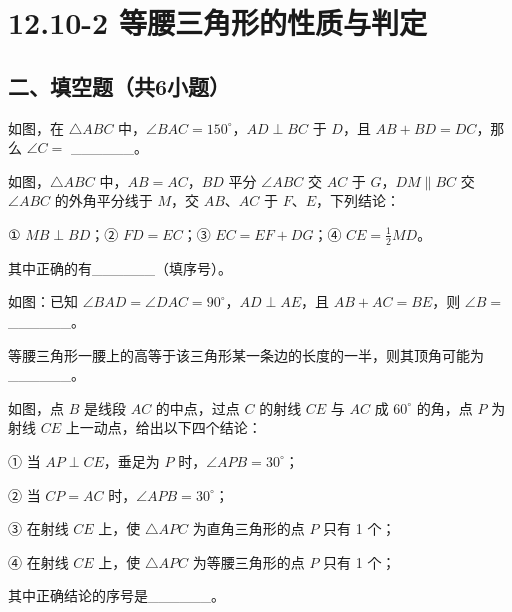 \chapter{12.10-2 等腰三角形的性质与判定}


\section*{二、填空题（共6小题）}

\blanklist[9]

\item 如图，在 $\triangle ABC$ 中，$\angle BAC = 150^\circ$，$AD \perp BC$ 于 $D$，且 $AB + BD = DC$，那么 $\angle C =$ \_\_\_\_\_\_。


\item 如图，$\triangle ABC$ 中，$AB = AC$，$BD$ 平分 $\angle ABC$ 交 $AC$ 于 $G$，$DM \parallel BC$ 交 $\angle ABC$ 的外角平分线于 $M$，交 $AB$、$AC$ 于 $F$、$E$，下列结论：

① $MB \perp BD$；② $FD = EC$；③ $EC = EF + DG$；④ $CE = \frac{1}{2}MD$。

其中正确的有\_\_\_\_\_\_（填序号）。


\item 如图：已知 $\angle BAD = \angle DAC = 90^\circ$，$AD \perp AE$，且 $AB + AC = BE$，则 $\angle B =$ \_\_\_\_\_\_。


\item 等腰三角形一腰上的高等于该三角形某一条边的长度的一半，则其顶角可能为\_\_\_\_\_\_。

\item 如图，点 $B$ 是线段 $AC$ 的中点，过点 $C$ 的射线 $CE$ 与 $AC$ 成 $60^\circ$ 的角，点 $P$ 为射线 $CE$ 上一动点，给出以下四个结论：

① 当 $AP \perp CE$，垂足为 $P$ 时，$\angle APB = 30^\circ$；

② 当 $CP = AC$ 时，$\angle APB = 30^\circ$；

③ 在射线 $CE$ 上，使 $\triangle APC$ 为直角三角形的点 $P$ 只有 1 个；

④ 在射线 $CE$ 上，使 $\triangle APC$ 为等腰三角形的点 $P$ 只有 1 个；

其中正确结论的序号是\_\_\_\_\_\_。


